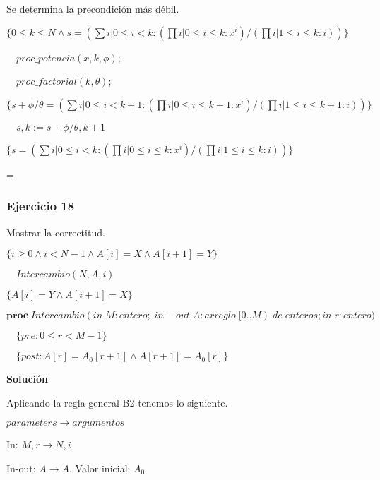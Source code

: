 \documentclass[hidelinks]{article}
\newenvironment{absolutelynopagebreak}
{\par\nobreak\vfil\penalty0\vfilneg
	\vtop\bgroup}
{\par\xdef\tpd{\the\prevdepth}\egroup
	\prevdepth=\tpd}
\begin{document}
Se determina la precondición más débil.\par

\begin{absolutelynopagebreak}
	$\{0 \leq k \leq N \land s = (\sum i| 0 \leq i < k: (\prod i| 0 \leq i \leq k : x^i) / (\prod i| 1 \leq i \leq k : i))\}$ \par
	$\quad proc\_potencia(x,k,\phi)$; \par
	$\quad proc\_factorial(k,\theta)$; \par
	$\{ s + \phi/\theta = (\sum i| 0 \leq i < k + 1: (\prod i| 0 \leq i \leq k + 1 : x^i) / (\prod i| 1 \leq i \leq k + 1 : i))\}$ \par
	$\quad s,k := s + \phi/\theta, k + 1$ \par
	$\{ s = (\sum i| 0 \leq i < k: (\prod i| 0 \leq i \leq k : x^i) / (\prod i| 1 \leq i \leq k : i))\}$ \par
\end{absolutelynopagebreak}

\newpage

\subsubsection{Ejercicio 18}


Mostrar la correctitud.\par
$\{ i \geq 0 \land i < N - 1 \land A[i] = X \land A[i+1] = Y\}$\par
$\quad Intercambio(N,A,i)$\par
$\{ A[i] = Y \land A[i + 1] = X\}$\par

$\textbf{proc} \; Intercambio(in \; M: entero; \; in-out \; A: arreglo \; [0..M) \; de \; enteros; in \; r: entero)$ \par
$\quad \{pre: 0 \leq r < M - 1\}$ \par
$\quad \{post: A[r] = A_0[r + 1] \land A[r + 1] = A_0[r]\}$\par

\textbf{Solución}\par

Aplicando la regla general B2 tenemos lo siguiente.\par

\hspace{5em} $parameters \rightarrow argumentos$\par

In: $M, r \rightarrow N, i$\par
In-out: $A \rightarrow A$. Valor inicial: $A_0$\par
\end{document}
